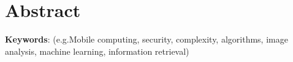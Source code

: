 \chapter*{\centering Abstract}


\lipsum[1]

\vspace{2in}
\textbf{Keywords}: (e.g.Mobile computing, security, complexity, algorithms, image analysis, machine learning, information retrieval)

